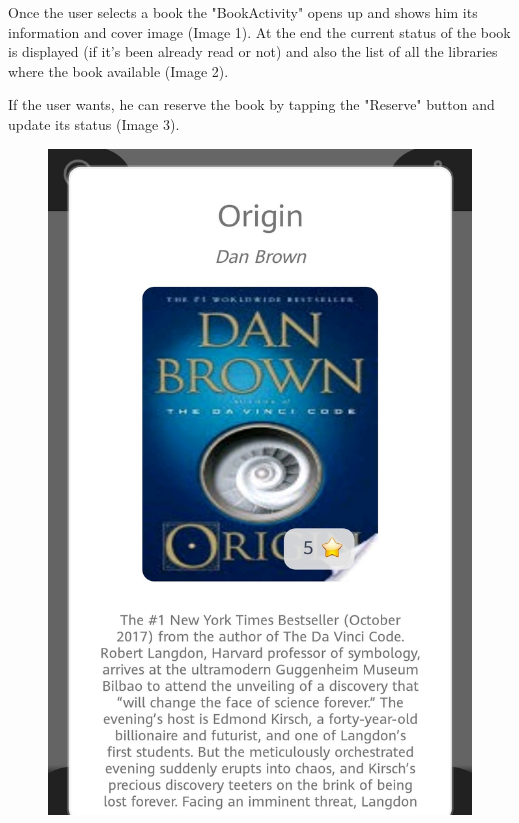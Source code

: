 \newpage
{}
Once the user selects a book the "BookActivity" opens up and shows him its information and cover image (Image 1). At the end the current status of the book is displayed (if it's been already read or not) and also the list of all the libraries where the book available (Image 2).\par
If the user wants, he can reserve the book by tapping the "Reserve" button and update its status (Image 3).
\begin{figure}[H]
	\centering
	\includegraphics[scale=0.15]{Images/UI/Book/1}
	\hspace{0.5cm}

\end{figure}
